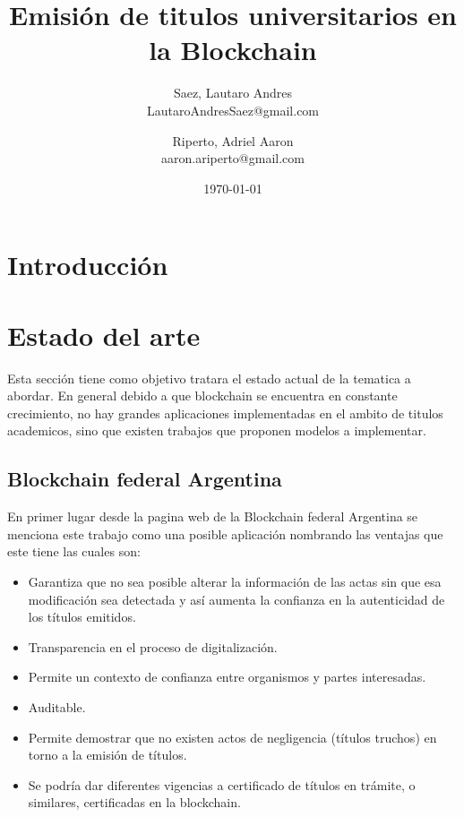 \documentclass[11pt,a4paper]{article}
\title{ 
    Emisión de titulos universitarios
    en la Blockchain
}
\author{
    Saez, Lautaro Andres \\ \small{ LautaroAndresSaez@gmail.com } 
    \and 
    Riperto, Adriel Aaron \\ \small{ aaron.ariperto@gmail.com } 
}
\date{\today}
\begin{document}
    \maketitle

    \section{Introducción}

    \section{Estado del arte}

        Esta sección tiene como objetivo tratara el estado actual de la tematica a abordar.
        En general debido a que blockchain se encuentra en constante crecimiento, no hay 
        grandes aplicaciones implementadas en el ambito de titulos academicos, sino que existen
        trabajos que proponen modelos a implementar. %

        \subsection{Blockchain federal Argentina}

        En primer lugar desde la pagina web de la Blockchain federal  Argentina %
        se menciona este trabajo como una posible aplicación nombrando las 
        ventajas que este tiene las cuales son:
        
        \begin{itemize}
            \item Garantiza que no sea posible alterar la 
            información de las actas sin que esa modificación sea detectada y así aumenta la confianza en la autenticidad de los títulos emitidos. 
            \item Transparencia en el proceso de digitalización.
            \item Permite un contexto de confianza entre organismos y partes interesadas. 
            \item Auditable.
            \item Permite demostrar que no existen actos de negligencia (títulos truchos) en torno a la emisión de títulos.
            \item Se podría dar diferentes vigencias a certificado de títulos en trámite, o similares, certificadas en la blockchain.
        \end{itemize}
\end{document}
